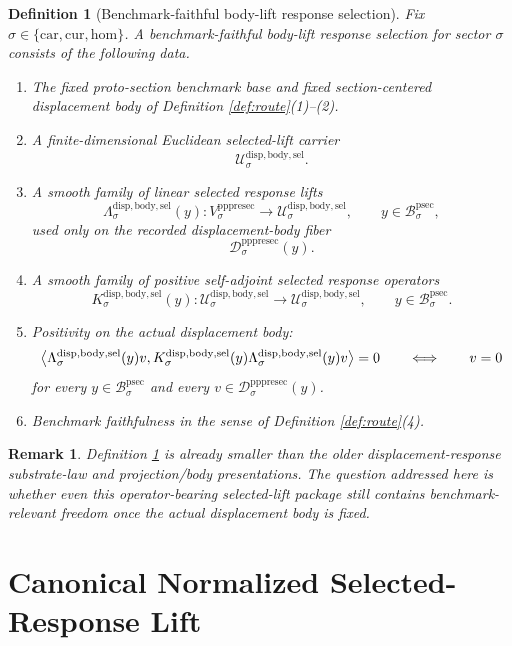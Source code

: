 \documentclass[11pt]{article}
\newcommand{\Car}{\mathrm{car}}
\newcommand{\Cur}{\mathrm{cur}}
\newcommand{\Hom}{\mathrm{hom}}
\newcommand{\ProtoSectionBody}[1]{\mathcal B_{#1}^{\mathrm{psec}}}
\newcommand{\PrePreProtoSectionVertical}[1]{V_{#1}^{\mathrm{pppresec}}}
\newcommand{\PrePreProtoSectionResidualBody}[1]{\mathcal D_{#1}^{\mathrm{pppresec}}}
\newcommand{\LiftSelectionCarrier}[1]{\mathcal U_{#1}^{\mathrm{disp,body,sel}}}
\newcommand{\SelectedResponseLift}[1]{\Lambda_{#1}^{\mathrm{disp,body,sel}}}
\newcommand{\SelectedResponseOperator}[1]{K_{#1}^{\mathrm{disp,body,sel}}}
\newtheorem{definition}{Definition}
\newtheorem{remark}{Remark}
\begin{document}
\begin{definition}[Benchmark-faithful body-lift response selection]
\label{def:selection}
Fix \(\sigma\in\{\Car,\Cur,\Hom\}\). A \emph{benchmark-faithful body-lift response selection} for sector \(\sigma\) consists of the following data.
\begin{enumerate}
    \item The fixed proto-section benchmark base and fixed section-centered displacement body of Definition \ref{def:route}(1)--(2).
    \item A finite-dimensional Euclidean selected-lift carrier
    \[
    \LiftSelectionCarrier{\sigma}.
    \]
    \item A smooth family of linear selected response lifts
    \[
    \SelectedResponseLift{\sigma}(y):
    \PrePreProtoSectionVertical{\sigma}\to\LiftSelectionCarrier{\sigma},
    \qquad
    y\in\ProtoSectionBody{\sigma},
    \]
    used only on the recorded displacement-body fiber
    \[
    \PrePreProtoSectionResidualBody{\sigma}(y).
    \]
    \item A smooth family of positive self-adjoint selected response operators
    \[
    \SelectedResponseOperator{\sigma}(y):
    \LiftSelectionCarrier{\sigma}\to\LiftSelectionCarrier{\sigma},
    \qquad
    y\in\ProtoSectionBody{\sigma}.
    \]
    \item Positivity on the actual displacement body:
    \[
    \ev{
    \SelectedResponseLift{\sigma}(y)v,
    \SelectedResponseOperator{\sigma}(y)\SelectedResponseLift{\sigma}(y)v
    }
    =0
    \qquad\Longleftrightarrow\qquad
    v=0
    \]
    for every \(y\in\ProtoSectionBody{\sigma}\) and every \(v\in\PrePreProtoSectionResidualBody{\sigma}(y)\).
    \item Benchmark faithfulness in the sense of Definition \ref{def:route}(4).
\end{enumerate}
\end{definition}

\begin{remark}
Definition \ref{def:selection} is already smaller than the older displacement-response substrate-law and projection/body presentations. The question addressed here is whether even this operator-bearing selected-lift package still contains benchmark-relevant freedom once the actual displacement body is fixed.
\end{remark}

\section{Canonical Normalized Selected-Response Lift}
\end{document}

